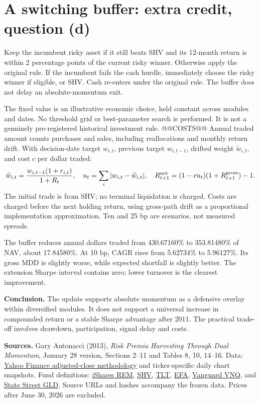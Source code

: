 \documentclass[11pt,letterpaper]{article}
\begin{document}
\newpage
\section{A switching buffer: extra credit, question (d)}
Keep the incumbent risky asset if it still beats SHV and its 12-month return is within 2 percentage points of the current risky winner. Otherwise apply the original rule. If the incumbent fails the cash hurdle, immediately choose the risky winner if eligible, or SHV. Cash re-enters under the original rule. The buffer does not delay an absolute-momentum exit.

The fixed value is an illustrative economic choice, held constant across modules and dates. No threshold grid or best-parameter search is performed. It is not a genuinely pre-registered historical investment rule.
@@COSTS@@
Annual traded amount counts purchases and sales, including reallocations and monthly return drift. With decision-date target \(w_{i,t}\), previous target \(w_{i,t-1}\), drifted weight \(\widetilde w_{i,t}\), and cost \(c\) per dollar traded:
\[
 \widetilde w_{i,t}=\frac{w_{i,t-1}(1+r_{i,t})}{1+R_t},\quad
 u_t=\sum_i|w_{i,t}-\widetilde w_{i,t}|,\quad
 R_{t+1}^{\rm net}=(1-cu_t)(1+R_{t+1}^{\rm gross})-1.
\]
The initial trade is from SHV; no terminal liquidation is charged. Costs are charged before the next holding return, using gross-path drift as a proportional implementation approximation. Ten and 25 bp are scenarios, not measured spreads.

The buffer reduces annual dollars traded from 430.67160\% to 353.81480\% of NAV, about 17.84580\%. At 10 bp, CAGR rises from 5.62734\% to 5.96127\%. Its gross MDD is slightly worse, while expected shortfall is slightly better. The extension Sharpe interval contains zero; lower turnover is the clearest improvement.

\textbf{Conclusion.} The update supports absolute momentum as a defensive overlay within diversified modules. It does not support a universal increase in compounded return or a stable Sharpe advantage after 2011. The practical trade-off involves drawdown, participation, signal delay and costs.

\small
\textbf{Sources.} Gary Antonacci (2013), \emph{Risk Premia Harvesting Through Dual Momentum}, January 28 version, Sections 2--11 and Tables 8, 10, 14--16. Data: \href{https://help.yahoo.com/kb/SLN28256.html}{Yahoo Finance adjusted-close methodology} and ticker-specific daily chart snapshots. Fund definitions: \href{https://www.ishares.com/us/products/239543/ishares-mortgage-real-estate-etf}{iShares REM}, \href{https://www.ishares.com/us/products/239466/ishares-short-treasury-bond-etf}{SHV}, \href{https://www.ishares.com/us/products/239454/ishares-20-year-treasury-bond-etf}{TLT}, \href{https://www.ishares.com/us/products/239623/ishares-msci-eafe-etf}{EFA}, \href{https://advisors.vanguard.com/investments/products/vnq/vanguard-real-estate-etf}{Vanguard VNQ}, and \href{https://www.ssga.com/us/en/institutional/etfs/spdr-gold-shares-gld}{State Street GLD}. Source URLs and hashes accompany the frozen data. Prices after June 30, 2026 are excluded.
\normalsize
\end{document}
